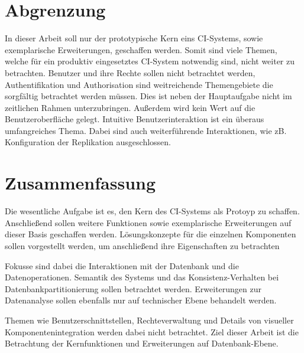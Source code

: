 \section{Abgrenzung}

In dieser Arbeit soll nur der prototypische Kern eins \ac{CI}-Systems,
sowie exemplarische Erweiterungen, geschaffen werden.
Somit sind viele Themen, welche für ein produktiv eingesetztes \ac{CI}-System notwendig
sind, nicht weiter zu betrachten.
Benutzer und ihre Rechte sollen nicht betrachtet werden,
Authentifikation und Authorisation sind weitreichende Themengebiete
die sorgf\"altig betrachtet werden m\"ussen.
Dies ist neben der Hauptaufgabe nicht im zeitlichen Rahmen unterzubringen.
Außerdem wird kein Wert auf die Benutzeroberfläche gelegt.
Intuitive Benutzerinteraktion ist ein \"uberaus umfangreiches Thema.
Dabei sind auch weiterführende Interaktionen,
wie zB. Konfiguration der Replikation ausgeschlossen.


\section{Zusammenfassung}


Die wesentliche Aufgabe ist es, den Kern des CI-Systems als Protoyp zu schaffen.
Anschließend sollen weitere Funktionen sowie exemplarische Erweiterungen
auf dieser Basis geschaffen werden.
L\"osungskonzepte f\"ur die einzelnen Komponenten sollen vorgestellt werden,
um anschließend ihre Eigenschaften zu betrachten

Fokusse sind dabei die Interaktionen mit der Datenbank und die Datenoperationen.
Semantik des Systems und das Konsistenz-Verhalten bei Datenbankpartitionierung
sollen betrachtet werden. Erweiterungen zur Datenanalyse sollen ebenfalls nur auf technischer Ebene behandelt werden.

Themen wie Benutzerschnittstellen, Rechteverwaltung und Details
von visueller Komponentenintegration werden dabei nicht betrachtet.
Ziel dieser Arbeit ist die Betrachtung der Kernfunktionen und Erweiterungen auf Datenbank-Ebene.

